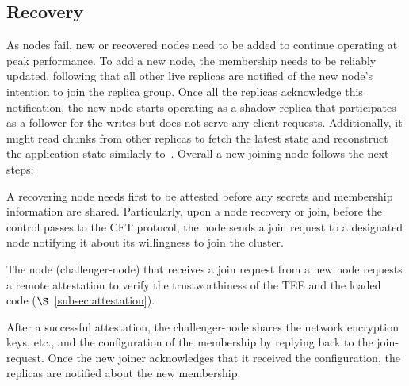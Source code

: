 \subsection{Recovery}

As nodes fail, new or recovered nodes need to be added to continue operating at peak performance. To add a new node, the membership needs to be reliably updated, following that all other live replicas are notified of the new node’s
intention to join the replica group. Once all the replicas acknowledge this notification, the new node starts operating as a shadow replica that participates as a follower for  the writes but does not serve any client requests. Additionally, it might read chunks from other replicas to fetch
the latest state and reconstruct the application state similarly to~\cite{10.1145/2815400.2815425, 10.1145/2043556.2043560}. Overall a new joining node follows the next steps:

    A recovering node needs first to be attested before any secrets and membership information are shared. Particularly, upon a node recovery or join, before the control passes to the CFT protocol, the node sends a join request to a designated node notifying it about its willingness to join the cluster. %
   
    The node (challenger-node) that receives a join request from a new node requests a remote attestation to verify the trustworthiness of the TEE and the loaded code ($\S$~\ref{subsec:attestation}). 
   
     After a successful attestation, the challenger-node shares the network encryption keys, etc., and the configuration of the membership by replying back to the join-request. Once the new joiner acknowledges that it received the configuration, the replicas are notified about the new membership. 
    
